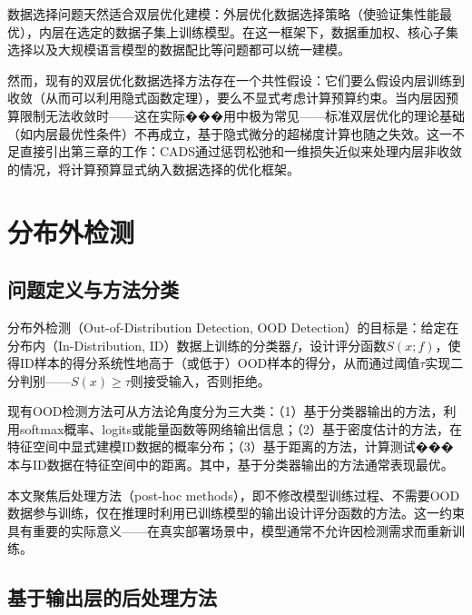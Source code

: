 数据选择问题天然适合双层优化建模：外层优化数据选择策略（使验证集性能最优），内层在选定的数据子集上训练模型\cite{zhou2022probabilistic, killamsetty2021glister, borsos2020coresets}。在这一框架下，数据重加权、核心子集选择以及大规模语言模型的数据配比\cite{pan2024scalebio}等问题都可以统一建模。

然而，现有的双层优化数据选择方法存在一个共性假设：它们要么假设内层训练到收敛（从而可以利用隐式函数定理），要么不显式考虑计算预算约束。当内层因预算限制无法收敛时——这在实际���用中极为常见——标准双层优化的理论基础（如内层最优性条件）不再成立，基于隐式微分的超梯度计算也随之失效。这一不足直接引出第三章的工作：CADS通过惩罚松弛和一维损失近似来处理内层非收敛的情况，将计算预算显式纳入数据选择的优化框架。


\section{分布外检测}\label{sec:ood-detection}

\subsection{问题定义与方法分类}

分布外检测（Out-of-Distribution Detection, OOD Detection）\cite{yang2021generalized_survey}的目标是：给定在分布内（In-Distribution, ID）数据上训练的分类器$f$，设计评分函数$S(x; f)$，使得ID样本的得分系统性地高于（或低于）OOD样本的得分，从而通过阈值$\tau$实现二分判别——$S(x) \geq \tau$则接受输入，否则拒绝。

现有OOD检测方法可从方法论角度分为三大类\cite{yang2021generalized_survey}：（1）基于分类器输出的方法，利用softmax概率\cite{hendrycks2016msp}、logits或能量函数\cite{liu2020energy}等网络输出信息；（2）基于密度估计的方法\cite{zong2018deep_densi, nalisnick2018deep_densi, zisselman2020deep_densi, kirichenko2020normalizing_densi}，在特征空间中显式建模ID数据的概率分布；（3）基于距离的方法\cite{lee2018maha_dist, sun2022knn, ming2022cider_dist}，计算测试���本与ID数据在特征空间中的距离。其中，基于分类器输出的方法通常表现最优\cite{yang2021generalized_survey}。

本文聚焦后处理方法（post-hoc methods），即不修改模型训练过程、不需要OOD数据参与训练，仅在推理时利用已训练模型的输出设计评分函数的方法。这一约束具有重要的实际意义——在真实部署场景中，模型通常不允许因检测需求而重新训练。

\subsection{基于输出层的后处理方法}

